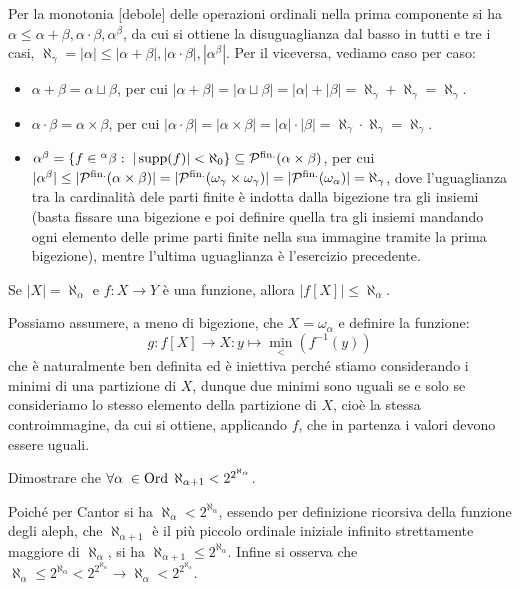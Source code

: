 \begin{soln}
	Per la monotonia [debole] delle operazioni ordinali nella prima componente si ha $\alpha \leq \alpha + \beta, \alpha \cdot \beta, \alpha^\beta$, da cui si ottiene la disuguaglianza dal basso 
	in tutti e tre i casi, $\aleph_\gamma = |\alpha| \leq |\alpha + \beta|, |\alpha \cdot \beta|, |\alpha^\beta|$. Per il viceversa, vediamo caso per caso:
	\begin{itemize}
		\item $\alpha + \beta = \alpha \sqcup \beta$, per cui $|\alpha + \beta| = |\alpha \sqcup \beta| = |\alpha| + |\beta| = \aleph_\gamma + \aleph_\gamma = \aleph_\gamma$.
		\item $\alpha \cdot \beta = \alpha \times \beta$, per cui $|\alpha \cdot \beta| = |\alpha \times \beta| = |\alpha| \cdot |\beta| = \aleph_\gamma \cdot \aleph_\gamma = \aleph_\gamma$.
		\item $\alpha^\beta = \{f \in {}^\alpha\beta : \; |\operatorname{supp}(f)| < \aleph_0\} \subseteq \mathcal{P}^{\text{fin.}}(\alpha \times \beta)$, per cui $|\alpha^\beta| \leq |\mathcal{P}^{\text{fin.}}(\alpha \times \beta)| = |\mathcal{P}^{\text{fin.}}(\omega_\gamma \times \omega_\gamma)| = |\mathcal{P}^{\text{fin.}}(\omega_\alpha)| = \aleph_\gamma$,
		dove l'uguaglianza tra la cardinalità dele parti finite è indotta dalla bigezione tra gli insiemi (basta fissare una bigezione e poi definire quella tra gli insiemi mandando ogni elemento delle prime parti finite nella sua immagine tramite la prima bigezione),
		mentre l'ultima uguaglianza è l'esercizio precedente.
	\end{itemize}
\end{soln}

\begin{exercise}
	Se $|X| = \aleph_\alpha$ e $f : X \to Y$ è una funzione, allora $|f[X]| \leq \aleph_\alpha$.
\end{exercise}

\begin{soln}
	Possiamo assumere, a meno di bigezione, che $X = \omega_\alpha$ e definire la funzione:
	\[ g : f[X] \to X : y \mapsto \min_<(f^{-1}(y))
		\]
	che è naturalmente ben definita ed è iniettiva perché stiamo considerando i minimi di una partizione di $X$, dunque due minimi sono uguali se e solo se consideriamo lo stesso elemento della partizione di $X$, cioè la stessa controimmagine,
	da cui si ottiene, applicando $f$, che in partenza i valori devono essere uguali.
\end{soln}

\begin{exercise}
	Dimostrare che $\forall \alpha \; \in \operatorname{Ord} \; \aleph_{\alpha + 1} < 2^{2^{\aleph_\alpha}}$.
\end{exercise}

\begin{soln}
	Poiché per Cantor si ha $\aleph_\alpha < 2^{\aleph_\alpha}$, essendo per definizione ricorsiva della funzione degli aleph, che $\aleph_{\alpha + 1}$ è il più piccolo ordinale iniziale infinito strettamente maggiore di $\aleph_\alpha$, si ha $\aleph_{\alpha + 1} \leq 2^{\aleph_\alpha}$.
	Infine si osserva che $\aleph_{\alpha} \leq 2^{\aleph_\alpha} < 2^{2^{\aleph_\alpha}} \to \aleph_{\alpha} < 2^{2^{\aleph_\alpha}}$.
\end{soln}